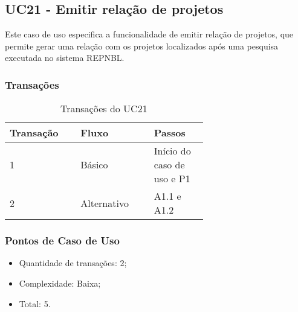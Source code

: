 \subsection{UC21 - Emitir relação de projetos}
  
  Este caso de uso especifica a funcionalidade de emitir relação de projetos, que permite gerar uma relação com
  os projetos localizados após uma pesquisa executada no sistema REPNBL.
  
  \subsubsection{Transações}

  \begin{table*}[!h]
  \centering
  \caption{Transações do UC21}
  \label{uc21_transactions}
    \begin{tabular}{|p{0.20\linewidth}|p{0.25\linewidth}|p{0.20\linewidth}|}
    \hline
    \textbf{Transação} & \textbf{Fluxo} & \textbf{Passos} \\ 
    \hline
    1 & Básico & Início do caso de uso e P1\\
    \hline
    2 & Alternativo & A1.1 e A1.2 \\
    \hline
    \end{tabular}
  \end{table*}

  \subsubsection{Pontos de Caso de Uso}

  \begin{itemize}
  \item Quantidade de transações: 2;
  \item Complexidade: Baixa;
  \item Total: 5.
  \end{itemize}
